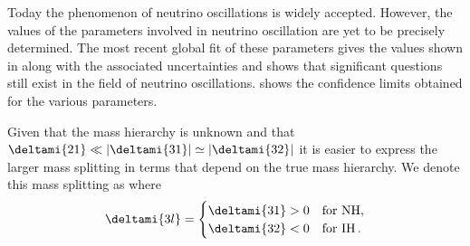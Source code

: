 
Today the phenomenon of neutrino oscillations is widely accepted. 
However, the values of the parameters involved in neutrino oscillation are yet to be precisely determined.
The most recent global fit of these parameters gives the values shown in  along with the associated uncertainties and shows that significant questions still exist in the field of neutrino oscillations.
 shows the confidence limits obtained for the various parameters.

Given that the mass hierarchy is unknown and that $\deltami{21} \ll |\deltami{31}| \simeq |\deltami{32}|$ it is easier to express the larger mass splitting in terms that depend on the true mass hierarchy.
We denote this mass splitting as  where
\begin{equation}
  \deltami{3l} =
  \begin{cases}
    \deltami{31} > 0 & \text{for NH} , \\
    \deltami{32} < 0 & \text{for IH} \, .
  \end{cases}
\end{equation}

